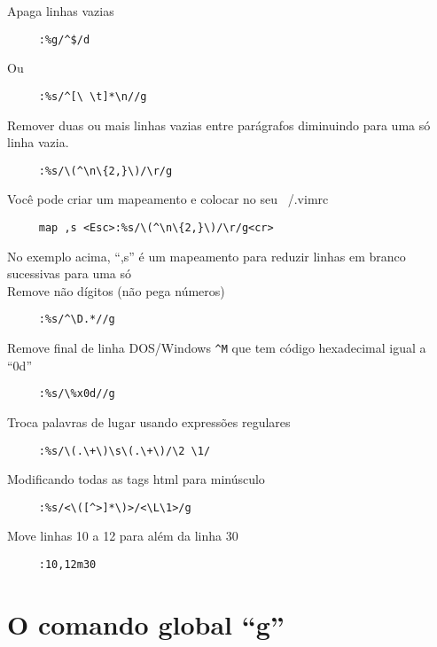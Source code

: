 Apaga linhas vazias

\begin{verbatim}
     :%g/^$/d
\end{verbatim}

Ou

\begin{verbatim}
     :%s/^[\ \t]*\n//g
\end{verbatim}

Remover duas ou mais linhas vazias entre parágrafos diminuindo para
uma só linha vazia.

\begin{verbatim}
     :%s/\(^\n\{2,}\)/\r/g
\end{verbatim}

Você pode criar um mapeamento e colocar no seu ~/.vimrc

\begin{verbatim}
     map ,s <Esc>:%s/\(^\n\{2,}\)/\r/g<cr>
\end{verbatim}

No exemplo acima, ``,s'' é um mapeamento para reduzir linhas em branco
sucessivas para uma só  \\


Remove não dígitos (não pega números)

\begin{verbatim}
     :%s/^\D.*//g
\end{verbatim}

Remove final de linha DOS/Windows \verb|^M| que tem código hexadecimal igual a
``0d''

\begin{verbatim}
     :%s/\%x0d//g
\end{verbatim}

Troca palavras de lugar usando expressões regulares

\begin{verbatim}
     :%s/\(.\+\)\s\(.\+\)/\2 \1/
\end{verbatim}

Modificando todas as tags html para minúsculo

\begin{verbatim}
     :%s/<\([^>]*\)>/<\L\1>/g
\end{verbatim}

Move linhas 10 a 12 para além da linha 30

\begin{verbatim}
     :10,12m30
\end{verbatim}

\section{O comando global ``g''}\label{sec:O comando global ``g''}

